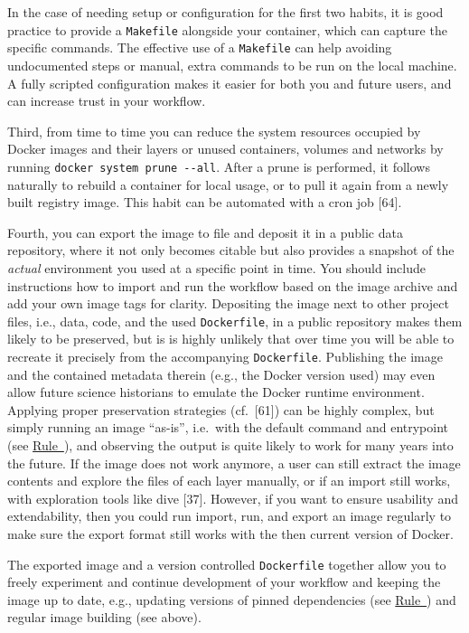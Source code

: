 \documentclass[10pt,letterpaper]{article}
\begin{document}
In the case of needing setup or configuration for the first two habits,
it is good practice to provide a \texttt{Makefile} alongside your
container, which can capture the specific commands. The effective use of
a \texttt{Makefile} can help avoiding undocumented steps or manual,
extra commands to be run on the local machine. A fully scripted
configuration makes it easier for both you and future users, and can
increase trust in your workflow.

Third, from time to time you can reduce the system resources occupied by
Docker images and their layers or unused containers, volumes and
networks by running \texttt{docker\ system\ prune\ -\/-all}. After a
prune is performed, it follows naturally to rebuild a container for
local usage, or to pull it again from a newly built registry image. This
habit can be automated with a cron job {[}64{]}.

Fourth, you can export the image to file and deposit it in a public data
repository, where it not only becomes citable but also provides a
snapshot of the \emph{actual} environment you used at a specific point
in time. You should include instructions how to import and run the
workflow based on the image archive and add your own image tags for
clarity. Depositing the image next to other project files, i.e., data,
code, and the used \texttt{Dockerfile}, in a public repository makes
them likely to be preserved, but is is highly unlikely that over time
you will be able to recreate it precisely from the accompanying
\texttt{Dockerfile}. Publishing the image and the contained metadata
therein (e.g., the Docker version used) may even allow future science
historians to emulate the Docker runtime environment. Applying proper
preservation strategies (cf.~{[}61{]}) can be highly complex, but simply
running an image ``as-is'', i.e.~with the default command and entrypoint
(see \hyperref[{rule:interactive}]{Rule~}),
and observing the output is quite likely to work for many years into the
future. If the image does not work anymore, a user can still extract the
image contents and explore the files of each layer manually, or if an
import still works, with exploration tools like dive {[}37{]}. However,
if you want to ensure usability and extendability, then you could run
import, run, and export an image regularly to make sure the export
format still works with the then current version of Docker.

The exported image and a version controlled \texttt{Dockerfile} together
allow you to freely experiment and continue development of your workflow
and keeping the image up to date, e.g., updating versions of pinned
dependencies (see
\hyperref[{rule:pinning}]{Rule~}) and regular
image building (see above).
\end{document}
